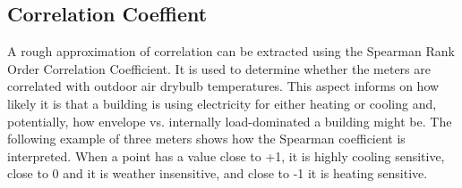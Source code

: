 \subsection{Correlation Coeffient}
\label{sec:weathercorrelationcoeff}

A rough approximation of correlation can be extracted using the Spearman Rank Order Correlation Coefficient. It is used to determine whether the meters are correlated with outdoor air drybulb temperatures. This aspect informs on how likely it is that a building is using electricity for either heating or cooling and, potentially, how envelope vs. internally load-dominated a building might be. The following example of three meters shows how the Spearman coefficient is interpreted. When a point has a value close to +1, it is highly cooling sensitive, close to 0 and it is weather insensitive, and close to -1 it is heating sensitive.